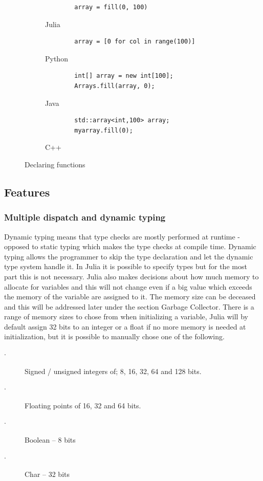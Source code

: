 \documentclass[a4paper,11pt]{article}
\begin{document}
\begin{figure}[H]
	\centering
	\begin{subfigure}[b]{0.7\textwidth}
		\centering
		\begin{lstlisting}
		array = fill(0, 100)
		\end{lstlisting}
		\caption{Julia}
	\end{subfigure}
	\begin{subfigure}[b]{0.7\textwidth}
		\centering
		\begin{lstlisting}
		array = [0 for col in range(100)]
		\end{lstlisting}
		\caption{Python}
	\end{subfigure}	
	\begin{subfigure}[b]{0.7\textwidth}
		\centering
		\begin{lstlisting}
		int[] array = new int[100];
		Arrays.fill(array, 0);
		\end{lstlisting}
		\caption{Java}
	\end{subfigure}
	\begin{subfigure}[b]{0.7\textwidth}
		\centering
		\begin{lstlisting}
		std::array<int,100> array;
		myarray.fill(0);
		\end{lstlisting}
		\caption{C++}
	\end{subfigure}
	\caption{Declaring functions}
	\label{Filling array with 0's}
\end{figure}

\subsection{Features}
\subsubsection{Multiple dispatch and dynamic typing}
Dynamic typing means that type checks are mostly performed at runtime - opposed to static typing which makes the type checks at compile time. Dynamic typing allows the programmer to skip the type declaration and let the dynamic type system handle it. In Julia it is possible to specify types but for the most part this is not necessary. Julia also makes decisions about how much memory to allocate for variables and this will not change even if a big value which exceeds the memory of the variable are assigned to it. The memory size can be deceased and this will be addressed later under the section Garbage Collector. There is a range of memory sizes to chose from when initializing a variable, Julia will by default assign 32 bits to an integer or a float if no more memory is needed at initialization, but it is possible to manually chose one of the following.
\begin{description}
	\item[$\cdot$] Signed / unsigned integers of; 8, 16, 32, 64 and 128 bits.
	\item[$\cdot$] Floating points of 16, 32 and 64 bits.  
	\item[$\cdot$] Boolean – 8 bits 
	\item[$\cdot$] Char – 32 bits 
\end{description}
\end{document}
